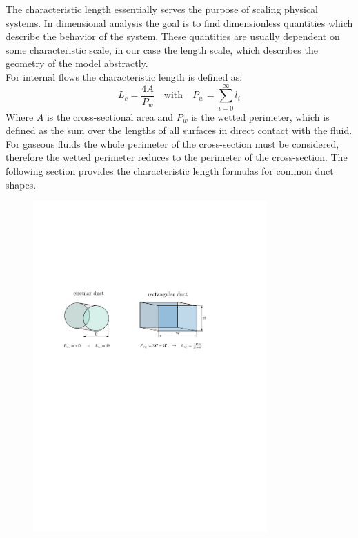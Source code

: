 The characteristic length essentially serves the purpose of scaling physical systems.
In dimensional analysis the goal is to find dimensionless quantities which describe the behavior of the system.
These quantities are usually dependent on some characteristic scale, in our case the length scale, which describes the geometry of the model abstractly.\\
For internal flows the characteristic length is defined as:
\begin{equation}
	L_c=\frac{4A}{P_w} \quad \text{with} \quad P_w = \sum^{\infty}_{i=0} l_i
\end{equation}
Where $A$ is the cross-sectional area and $P_w$ is the wetted perimeter, which is defined as the sum over the lengths of all surfaces in direct contact with the fluid.
For gaseous fluids the whole perimeter of the cross-section must be considered, therefore the wetted perimeter reduces to the perimeter of the cross-section.
The following section provides the characteristic length formulas for common duct shapes.
\cite{leishman_internal_2023}
\begin{figure}[H]
    \centering
    \includegraphics[width=0.8\textwidth]{src/02_foundations/fig_wetted-perimeter-nozzle-rect.pdf}
    \label{fig:wetted-rect-nozzle}
\end{figure}
